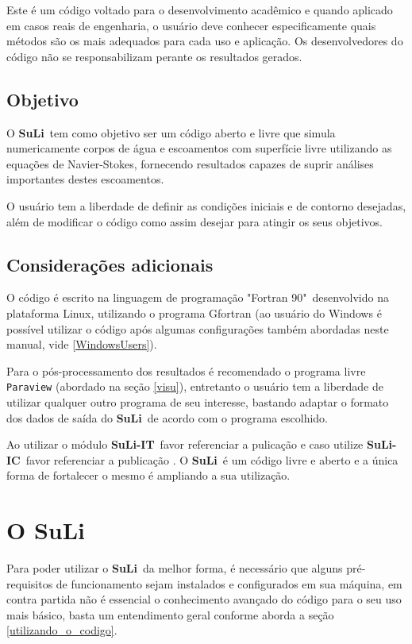 \documentclass[12pt, a4paper]{article}
\newcommand{\SL}{{\bf SuLi}}
\newcommand{\SLIT}{{\bf SuLi-IT}}
\newcommand{\SLIC}{{\bf SuLi-IC}}
\begin{document}
Este é um código voltado para o desenvolvimento acadêmico e quando aplicado em casos reais de engenharia, o usuário deve conhecer especificamente quais métodos são os mais adequados para cada uso e aplicação. Os desenvolvedores do código não se responsabilizam perante os resultados gerados.

\subsection{Objetivo}
O \SL\ tem como objetivo ser um código aberto e livre que simula numericamente corpos de água e escoamentos com superfície livre utilizando as equações de Navier-Stokes, fornecendo resultados capazes de suprir análises importantes destes escoamentos. 

O usuário tem a liberdade de definir as condições iniciais e de contorno desejadas, além de modificar o código como assim desejar para atingir os seus objetivos.


\subsection{Considerações adicionais}
O código é escrito na linguagem de programação "Fortran 90"\ desenvolvido na plataforma Linux, utilizando o programa Gfortran (ao usuário do Windows é possível utilizar o código após algumas configurações também abordadas neste manual, vide \ref{WindowsUsers}).

Para o pós-processamento dos resultados é recomendado o programa livre \verb|Paraview| (abordado na seção \ref{visu}), entretanto o usuário tem a liberdade de utilizar qualquer outro programa de seu interesse, bastando adaptar o formato dos dados de saída do \SL\ de acordo com o programa escolhido.

Ao utilizar o módulo \SLIT\ favor referenciar a pulicação \cite{monteiro2014} e caso utilize \SLIC\ favor referenciar a publicação \cite{monteiro2019}. O \SL\ é um código livre e aberto e a única forma de fortalecer o mesmo é ampliando a sua utilização.
\newpage

\section{O SuLi}
Para poder utilizar o \SL\ da melhor forma, é necessário que alguns pré-requisitos de funcionamento sejam instalados e configurados em sua máquina, em contra partida não é essencial o conhecimento avançado do código para o seu uso mais básico, basta um entendimento geral conforme aborda a seção \ref{utilizando_o_codigo}.
\end{document}
